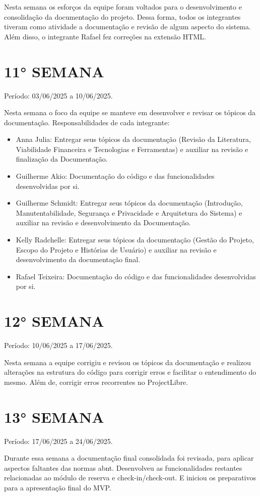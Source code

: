 \documentclass[
	12pt,				%
	openany,			%
	oneside,			%
	a4paper,			%
	english,			%
	french,				%
	spanish,			%
	brazil				%
	]{abntex2}
\begin{document}
\begin{apendicesenv}
Nesta semana os esforços da equipe foram voltados para o desenvolvimento e consolidação da documentação do projeto. 
Dessa forma, todos os integrantes tiveram como atividade a documentação e revisão de algum aspecto do sistema.  Além disso, o
integrante Rafael fez correções na extensão HTML.

\section{11° SEMANA}
Período: 03/06/2025 a 10/06/2025.

Nesta semana o foco da equipe se manteve em desenvolver e revisar os tópicos da documentação.
Responsabilidades de cada integrante:
\begin{itemize}
	\item Anna Julia: Entregar seus tópicos da documentação (Revisão da Literatura, Viabilidade Financeira e Tecnologias e Ferramentas) e auxiliar na revisão e finalização da Documentação.
	\item Guilherme Akio: Documentação do código e das funcionalidades desenvolvidas por si. 
	\item Guilherme Schmidt: Entregar seus tópicos da documentação (Introdução, Manutentabilidade, Segurança e Privacidade e Arquitetura do Sistema) e auxiliar na revisão e desenvolvimento da Documentação.
	\item Kelly Radchelle: Entregar seus tópicos da documentação (Gestão do Projeto,  Escopo do Projeto e Histórias de Usuário) e auxiliar na revisão e desenvolvimento da documentação final.
	\item Rafael Teixeira: Documentação do código e das funcionalidades desenvolvidas por si.
	\end{itemize}
\section{12° SEMANA}
Período: 10/06/2025 a 17/06/2025.

Nesta semana a equipe corrigiu e revisou os tópicos da documentação e realizou alterações na estrutura do código para corrigir erros e facilitar o entendimento do mesmo. Além de, corrigir erros recorrentes no ProjectLibre.
\section{13° SEMANA}
Período: 17/06/2025 a 24/06/2025.

Durante essa semana a documentação final consolidada foi revisada, para aplicar aspectos faltantes das normas abnt. Desenvolveu as funcionalidades restantes relacionadas ao módulo de reserva e check-in/check-out. E iniciou os preparativos para a apresentação final do MVP.

\end{apendicesenv}
\end{document}
